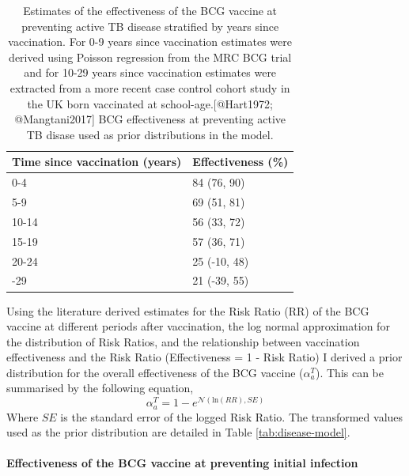\documentclass[11pt,twoside]{bristolthesis}
\begin{document}
  \begin{table}[!h]
  
  \caption{\label{tab:bcg-eff-est}Estimates of the effectiveness of the BCG vaccine at preventing active TB disease stratified by years since vaccination. For 0-9 years since vaccination estimates were derived using Poisson regression from the MRC BCG trial and for 10-29 years since vaccination estimates were extracted from a more recent case control cohort study in the UK born vaccinated at school-age.[@Hart1972; @Mangtani2017] BCG effectiveness at preventing active TB disase used as prior distributions in the model.}
  \centering
  \begin{tabular}{ll}
  \toprule
  Time since vaccination (years) & Effectiveness (\%)\\
  \midrule
  0-4 & 84 (76, 90)\\
  5-9 & 69 (51, 81)\\
  10-14 & 56 (33, 72)\\
  15-19 & 57 (36, 71)\\
  20-24 & 25 (-10, 48)\\
  \addlinespace
  25-29 & 21 (-39, 55)\\
  \bottomrule
  \end{tabular}
  \end{table}
  Using the literature derived estimates for the Risk Ratio (RR) of the BCG vaccine at different periods after vaccination, the log normal approximation for the distribution of Risk Ratios, and the relationship between vaccination effectiveness and the Risk Ratio (Effectiveness = 1 - Risk Ratio) I derived a prior distribution for the overall effectiveness of the BCG vaccine (\(\alpha^T_a\)). This can be summarised by the following equation,
  \begin{equation}
    \alpha^T_a = 1 - e^{\mathcal{N}(\text{ln}(RR), SE)}
    \label{eq:rr-to-alpha}
  \end{equation}
  Where \(SE\) is the standard error of the logged Risk Ratio. The transformed values used as the prior distribution are detailed in Table \ref{tab:disease-model}.
  
  \hypertarget{effectiveness-of-the-bcg-vaccine-at-preventing-initial-infection}{%
  \paragraph{Effectiveness of the BCG vaccine at preventing initial infection}\label{effectiveness-of-the-bcg-vaccine-at-preventing-initial-infection}}
  
\end{document}
